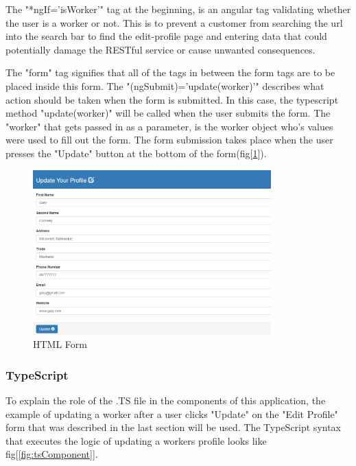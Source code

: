 \bigskip

The "*ngIf='isWorker'" tag at the beginning, is an angular tag validating whether the user is a worker or not. This is to prevent a customer from searching the url into the search bar to find the edit-profile page and entering data that could potentially damage the RESTful service or cause unwanted consequences. 

The "form" tag signifies that all of the tags in between the form tags are to be placed inside this form. The "(ngSubmit)='update(worker)'" describes what action should be taken when the form is submitted. In this case, the typescript method "update(worker)" will be called when the user submits the form. The "worker" that gets passed in as a parameter, is the worker object who's values were used to fill out the form. The form submission takes place when the user presses the "Update" button at the bottom of the form(fig[\ref{fig:form}]).

\begin{figure}[H]
    \centering
    \includegraphics[width=\textwidth, height=180pt]{DesignImages/editProfileForm.PNG}
    \caption{HTML Form}
    \label{fig:form}
\end{figure}

\bigskip

\subsubsection{TypeScript}
\label{sec:SystemDesignTypescript}
To explain the role of the .TS file in the components of this application, the example of updating a worker after a user clicks "Update" on the "Edit Profile" form that was described in the last section will be used. The TypeScript syntax that executes the logic of updating a workers profile looks like fig[\ref{fig:tsComponent}].


